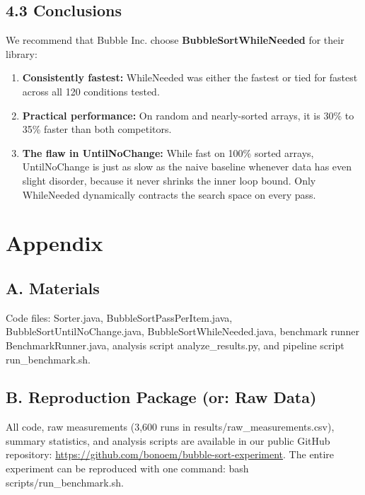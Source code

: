 \documentclass[10pt,a4paper]{article}
\begin{document}
\subsection*{4.3 Conclusions}
We recommend that Bubble Inc. choose \textbf{BubbleSortWhileNeeded} for their library:
\begin{enumerate}
    \item \textbf{Consistently fastest:} WhileNeeded was either the fastest or tied for fastest across all 120 conditions tested.
    \item \textbf{Practical performance:} On random and nearly-sorted arrays, it is 30\% to 35\% faster than both competitors.
    \item \textbf{The flaw in UntilNoChange:} While fast on 100\% sorted arrays, UntilNoChange is just as slow as the naive baseline whenever data has even slight disorder, because it never shrinks the inner loop bound. Only WhileNeeded dynamically contracts the search space on every pass.
\end{enumerate}

\section*{Appendix}

\subsection*{A. Materials}
Code files: Sorter.java, BubbleSortPassPerItem.java, BubbleSortUntilNoChange.java, BubbleSortWhileNeeded.java, benchmark runner BenchmarkRunner.java, analysis script analyze\_results.py, and pipeline script run\_benchmark.sh.

\subsection*{B. Reproduction Package (or: Raw Data)}
All code, raw measurements (3,600 runs in results/\allowbreak raw\_measurements.csv), summary statistics, and analysis scripts are available in our public GitHub repository: \url{https://github.com/bonoem/bubble-sort-experiment}. The entire experiment can be reproduced with one command: bash scripts/run\_benchmark.sh.
\end{document}
